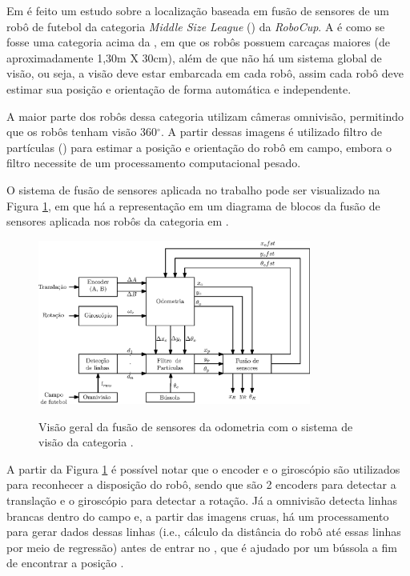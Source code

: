 \documentclass[acronym, symbols, table]{fei}
\begin{document}
Em \textcite{ismail2022soccer} é feito um estudo sobre a localização baseada em fusão de sensores de um robô de futebol da categoria \textit{Middle Size League} () da \textit{RoboCup}. A  é como se fosse uma categoria acima da , em que os robôs possuem carcaças maiores (de aproximadamente 1,30m X 30cm), além de que não há um sistema global de visão, ou seja, a visão deve estar embarcada em cada robô, assim cada robô deve estimar sua posição e orientação de forma automática e independente.

A maior parte dos robôs dessa categoria utilizam câmeras omnivisão, permitindo que os robôs tenham visão 360$^\circ$. A partir dessas imagens é utilizado filtro de partículas () para estimar a posição e orientação do robô em campo, embora o filtro necessite de um processamento computacional pesado.

O sistema de fusão de sensores aplicada no trabalho pode ser visualizado na Figura \ref{fig:msl_sensor_fusion}, em que há a representação em um diagrama de blocos da fusão de sensores aplicada nos robôs da categoria  em \textcite{ismail2022soccer}.

\begin{figure}[!htb]
	\centering
	\caption{Visão geral da fusão de sensores da odometria com o sistema de visão da categoria .} 
	\includegraphics[width=0.8\textwidth]{msl_sensor_fusion.eps}
	\label{fig:msl_sensor_fusion}
\end{figure}

A partir da Figura \ref{fig:msl_sensor_fusion} é possível notar que o encoder e o giroscópio são utilizados para reconhecer a disposição do robô, sendo que são 2 encoders para detectar a translação e o giroscópio para detectar a rotação. Já a omnivisão detecta linhas brancas dentro do campo e, a partir das imagens cruas, há um processamento para gerar dados dessas linhas (i.e., cálculo da distância do robô até essas linhas por meio de regressão) antes de entrar no , que é ajudado por um bússola a fim de encontrar a posição .
\end{document}
